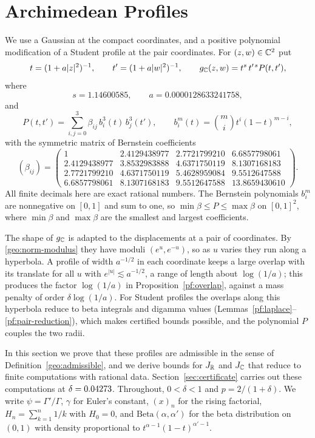 \section{Archimedean Profiles}
\label{pf:section}

We use a Gaussian at the compact coordinates, and a positive polynomial modification of a
Student profile at the pair coordinates. For $(z,w)\in\mathbb C^2$ put
\[
 t=(1+a|z|^2)^{-1},\qquad t'=(1+a|w|^2)^{-1},\qquad
 g_\mathbb C(z,w)=t^s\,t'^{\,s}P(t,t'),
\]
where
\[
 s=1.14600585,\qquad a=0.0000128633241758,
\]
and
\[
 P(t,t')=\sum_{i,j=0}^3\beta_{ij}\,b_i^3(t)\,b_j^3(t'),\qquad
 b_i^m(t)=\binom mi t^i(1-t)^{m-i},
\]
with the symmetric matrix of Bernstein coefficients
\begin{equation}\label{pf:bernstein-witness}
 (\beta_{ij})=\begin{pmatrix}
 1&2.4129438977&2.7721799210&6.6857798061\\
 2.4129438977&3.8532983888&4.6371750119&8.1307168183\\
 2.7721799210&4.6371750119&5.4628959084&9.5512647588\\
 6.6857798061&8.1307168183&9.5512647588&13.8659430610
 \end{pmatrix}.
\end{equation}
All finite decimals here are exact rational numbers. The Bernstein
polynomials $b_i^m$ are nonnegative on $[0,1]$ and sum to one, so
$\min\beta\le P\le\max\beta$ on $[0,1]^2$, where $\min\beta$ and
$\max\beta$ are the smallest and largest coefficients.

The shape of $g_\mathbb C$ is adapted to the displacements at a pair of
coordinates. By \eqref{geo:norm-modulus} they have moduli
$(e^u,e^{-u})$, so as $u$ varies they run along a hyperbola. A profile
of width $a^{-1/2}$ in each coordinate keeps a large overlap with its
translate for all $u$ with $e^{|u|}\lesssim a^{-1/2}$, a range of length
about $\log(1/a)$; this produces the factor $\log(1/a)$ in
Proposition~\ref{pf:overlap}, against a mass penalty of order
$\delta\log(1/a)$. For Student profiles the overlaps along this
hyperbola reduce to beta integrals and digamma values
(Lemmas~\ref{pf:laplace}--\ref{pf:pair-reduction}), which makes
certified bounds possible, and the polynomial $P$ couples the two radii.

In this section we prove that these profiles are admissible in the sense
of Definition~\ref{geo:admissible}, and we derive bounds for $J_\mathbb R$ and
$J_\mathbb C$ that reduce to finite computations with rational data.
Section~\ref{sec:certificate} carries out these computations at
$\delta=0.04273$. Throughout, $0<\delta<1$ and $p=2/(1+\delta)$. We
write $\psi=\Gamma'/\Gamma$, $\gamma$ for Euler's constant, $(x)_n$ for
the rising factorial, $H_n=\sum_{k=1}^n1/k$ with $H_0=0$, and
$\mathrm{Beta}(\alpha,\alpha')$ for the beta distribution on $(0,1)$
with density proportional to $t^{\alpha-1}(1-t)^{\alpha'-1}$.

